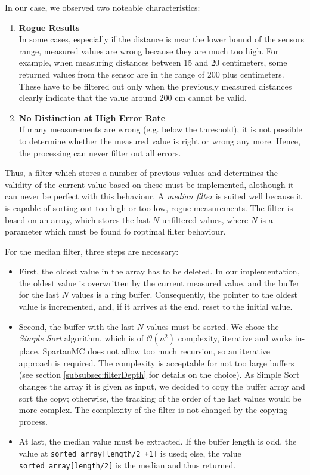 In our case, we observed two noteable characteristics:

\begin{enumerate}
    \item \textbf{Rogue Results}\hfill \\
    In some cases, especially if the distance is near the lower bound of the 
    sensors range, measured values are wrong because they are much too high.
    For example, when measuring distances between 15 and 20 centimeters, some
    returned values from the sensor are in the range of 200 plus centimeters.
    These have to be filtered out only when the previously measured distances
    clearly indicate that the value around 200 cm cannot be valid.
    \item \textbf{No Distinction at High Error Rate}\hfill \\
    If many measurements are wrong (e.g. below the threshold), it is not possible 
    to determine whether the measured value is right or wrong any more. Hence, the 
    processing can never filter out all errors.
\end{enumerate}

Thus, a filter which stores a number of previous values and determines the 
validity of the current value based on these must be implemented, alothough it can 
never be perfect with this behaviour. A \emph{median filter} is suited well because 
it is capable of sorting out too high or too low, rogue measurements. The filter is 
based on an array, which stores the last $N$ unfiltered values, where $N$ is a 
parameter which must be found fo roptimal filter behaviour. 

For the median filter, three steps are necessary:
\begin{itemize}
    \item First, the oldest value in the array has to be deleted. In our 
    implementation, the oldest value is overwritten by the current measured
    value, and the buffer for the last $N$ values is a ring buffer. Consequently,
    the pointer to the oldest value is incremented, and, if it arrives at the end,
    reset to the initial value.
    \item Second, the buffer with the last $N$ values must be sorted. We chose
    the \emph{Simple Sort} algorithm, which is of $\mathcal{O}(n^{2})$ complexity,
    iterative and works in-place. SpartanMC does not allow too much recursion,
    so an iterative approach is required. The complexity is acceptable for 
    not too large buffers (see section \ref{subsubsec:filterDepth} for 
    details on the choice). As Simple Sort changes the array it is given as 
    input, we decided to copy the buffer array and sort the copy; otherwise,
    the tracking of the order of the last values would be more complex. The 
    complexity of the filter is not changed by the copying process.
    \item At last, the median value must be extracted. If the buffer length is
    odd, the value at \texttt{sorted\_array[length/2 +1]} is used; else, the
    value \texttt{sorted\_array[length/2]} is the median and thus returned.
\end{itemize}

